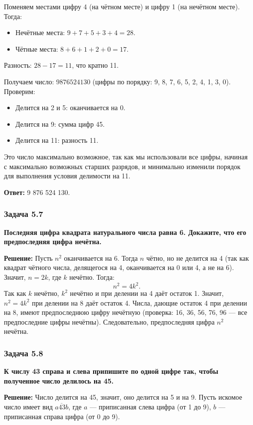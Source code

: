 \documentclass[12pt, a4paper]{article}
\begin{document}
Поменяем местами цифру 4 (на чётном месте) и цифру 1 (на нечётном месте). Тогда:
\begin{itemize}
    \item Нечётные места: $9 + 7 + 5 + 3 + 4 = 28$.
    \item Чётные места: $8 + 6 + 1 + 2 + 0 = 17$.
\end{itemize}
Разность: $28 - 17 = 11$, что кратно 11.

Получаем число: $9876524130$ (цифры по порядку: 9, 8, 7, 6, 5, 2, 4, 1, 3, 0). Проверим:
\begin{itemize}
    \item Делится на 2 и 5: оканчивается на 0.
    \item Делится на 9: сумма цифр 45.
    \item Делится на 11: разность 11.
\end{itemize}

Это число максимально возможное, так как мы использовали все цифры, начиная с максимально возможных старших разрядов, и минимально изменили порядок для выполнения условия делимости на 11.

\textbf{Ответ:} 9 876 524 130.

\subsubsection*{Задача 5.7}
\textbf{Последняя цифра квадрата натурального числа равна 6. Докажите, что его предпоследняя цифра нечётна.}

\textbf{Решение:}
Пусть $n^2$ оканчивается на 6. Тогда $n$ чётно, но не делится на 4 (так как квадрат чётного числа, делящегося на 4, оканчивается на 0 или 4, а не на 6). Значит, $n = 2k$, где $k$ нечётно. Тогда:
\[
n^2 = 4k^2.
\]
Так как $k$ нечётно, $k^2$ нечётно и при делении на 4 даёт остаток 1. Значит, $n^2 = 4k^2$ при делении на 8 даёт остаток 4. Числа, дающие остаток 4 при делении на 8, имеют предпоследнюю цифру нечётную (проверка: 16, 36, 56, 76, 96 — все предпоследние цифры нечётны). Следовательно, предпоследняя цифра $n^2$ нечётна.

\subsubsection*{Задача 5.8}
\textbf{К числу 43 справа и слева припишите по одной цифре так, чтобы полученное число делилось на 45.}

\textbf{Решение:}
Число делится на 45, значит, оно делится на 5 и на 9. Пусть искомое число имеет вид $\overline{a43b}$, где $a$ — приписанная слева цифра (от 1 до 9), $b$ — приписанная справа цифра (от 0 до 9).
\end{document}
